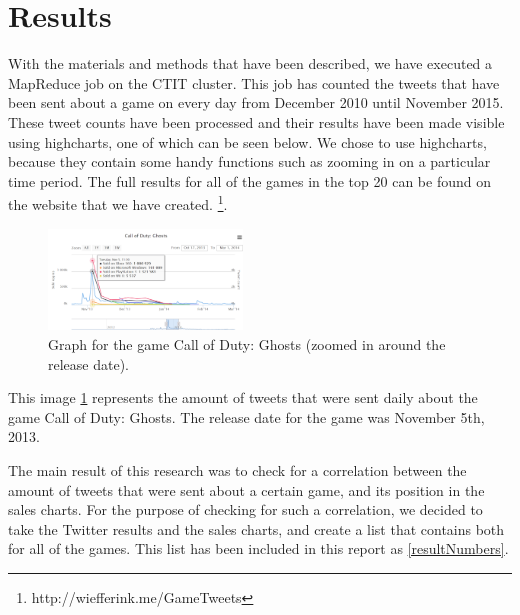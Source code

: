 \section{Results}
With the materials and methods that have been described, we have executed a MapReduce job on the CTIT cluster. This job has counted the tweets that have been sent about a game on every day from December 2010 until November 2015. These tweet counts have been processed and their results have been made visible using highcharts, one of which can be seen below. We chose to use highcharts, because they contain some handy functions such as zooming in on a particular time period. The full results for all of the games in the top 20 can be found on the website that we have created. \footnote{http://wiefferink.me/GameTweets}.

\begin{figure}[!ht]
	\centering
	\includegraphics[width=0.46\textwidth]{highchart-ghosts}
	\caption{Graph for the game Call of Duty: Ghosts (zoomed in around the release date).}
	\label{highchartghosts}
\end{figure}

This image \ref{highchartghosts} represents the amount of tweets that were sent daily about the game Call of Duty: Ghosts.  The release date for the game was November 5th, 2013.

The main result of this research was to check for a correlation between the amount of tweets that were sent about a certain game, and its position in the sales charts. For the purpose of checking for such a correlation, we decided to take the Twitter results and the sales charts, and create a list that contains both for all of the games. This list has been included in this report as \ref{resultNumbers}.